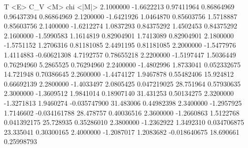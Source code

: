           T             <E>           C_V          <M>              chi            <|M|>  
      2.1000000     -1.6622213     0.97411964     0.86864969     0.96437394     0.86864969
      2.1200000     -1.6421926      1.0464870     0.85603756      1.5718887     0.85603756
      2.1400000     -1.6212274      1.0837293     0.84375292      1.4502453     0.84375292
      2.1600000     -1.5990583      1.1614819     0.82904901      1.7413089     0.82904901
      2.1800000     -1.5751152      1.2706316     0.81181085      2.4491195     0.81181085
      2.2000000     -1.5477976      1.4114883    -0.60621308      4.7192757     0.78655218
      2.2200000     -1.5197447      1.5036449     0.76294960      5.2865525     0.76294960
      2.2400000     -1.4802996      1.8733041    0.052332675      14.721948     0.70386645
      2.2600000     -1.4474127      1.9467878     0.55482406      15.924812     0.66692139
      2.2800000     -1.4033497      2.0805425    0.047219025      28.751964     0.57930635
      2.3000000     -1.3609512      1.9841014     0.18907140      31.431253     0.50134275
      2.3200000     -1.3271813      1.9460274   -0.035747900      31.483006     0.44982398
      2.3400000     -1.2957925      1.7146602   -0.034161788      28.478757     0.40036516
      2.3600000     -1.2660863      1.5122768    0.041392175      25.728935     0.35286010
      2.3800000     -1.2362922      1.3492310    0.034706875      23.335041     0.30300165
      2.4000000     -1.2087017      1.2083682   -0.018640675      18.690661     0.25998793
